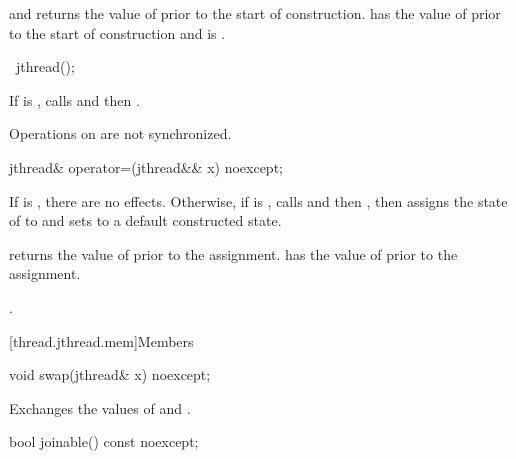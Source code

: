 \begin{itemdescr}
\pnum
\ensures
{}
and  returns the value of 
prior to the start of construction.
 has the value of 
prior to the start of construction
and  is .
\end{itemdescr}

%
\begin{itemdecl}
~jthread();
\end{itemdecl}

\begin{itemdescr}
\pnum
\effects
If  is ,
calls  and then .
\begin{note}
Operations on  are not synchronized.
\end{note}
\end{itemdescr}

%
\begin{itemdecl}
jthread& operator=(jthread&& x) noexcept;
\end{itemdecl}

\begin{itemdescr}
\pnum
\effects
If  is , there are no effects.
Otherwise, if  is ,
calls  and then ,
then assigns the state of  to 
and sets  to a default constructed state.

\pnum
\ensures
{} returns the value of 
prior to the assignment.
 has the value of 
prior to the assignment.

\pnum
\returns
{}.
\end{itemdescr}

[thread.jthread.mem]{Members}

%
\begin{itemdecl}
void swap(jthread& x) noexcept;
\end{itemdecl}

\begin{itemdescr}
\pnum
\effects
Exchanges the values of  and .
\end{itemdescr}

%
\begin{itemdecl}
bool joinable() const noexcept;
\end{itemdecl}

